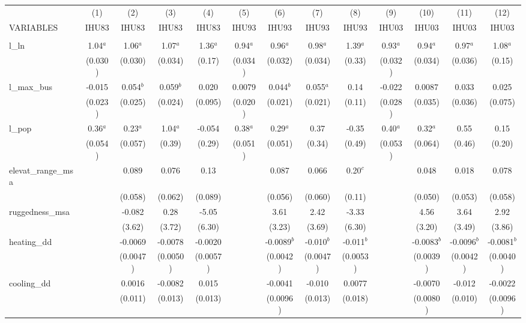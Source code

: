 \documentclass[]{article}
\begin{document}
\begin{tabular}{lcccccccccccc} \hline
 & (1) & (2) & (3) & (4) & (5) & (6) & (7) & (8) & (9) & (10) & (11) & (12) \\
VARIABLES & IHU83 & IHU83 & IHU83 & IHU83 & IHU93 & IHU93 & IHU93 & IHU93 & IHU03 & IHU03 & IHU03 & IHU03 \\ \hline
 &  &  &  &  &  &  &  &  &  &  &  &  \\
l\_ln & 1.04$^a$ & 1.06$^a$ & 1.07$^a$ & 1.36$^a$ & 0.94$^a$ & 0.96$^a$ & 0.98$^a$ & 1.39$^a$ & 0.93$^a$ & 0.94$^a$ & 0.97$^a$ & 1.08$^a$ \\
 & (0.030) & (0.030) & (0.034) & (0.17) & (0.034) & (0.032) & (0.034) & (0.33) & (0.032) & (0.034) & (0.036) & (0.15) \\
l\_max\_bus & -0.015 & 0.054$^b$ & 0.059$^b$ & 0.020 & 0.0079 & 0.044$^b$ & 0.055$^a$ & 0.14 & -0.022 & 0.0087 & 0.033 & 0.025 \\
 & (0.023) & (0.025) & (0.024) & (0.095) & (0.020) & (0.021) & (0.021) & (0.11) & (0.028) & (0.035) & (0.036) & (0.075) \\
l\_pop & 0.36$^a$ & 0.23$^a$ & 1.04$^a$ & -0.054 & 0.38$^a$ & 0.29$^a$ & 0.37 & -0.35 & 0.40$^a$ & 0.32$^a$ & 0.55 & 0.15 \\
 & (0.054) & (0.057) & (0.39) & (0.29) & (0.051) & (0.051) & (0.34) & (0.49) & (0.053) & (0.064) & (0.46) & (0.20) \\
elevat\_range\_msa &  & 0.089 & 0.076 & 0.13 &  & 0.087 & 0.066 & 0.20$^c$ &  & 0.048 & 0.018 & 0.078 \\
 &  & (0.058) & (0.062) & (0.089) &  & (0.056) & (0.060) & (0.11) &  & (0.050) & (0.053) & (0.058) \\
ruggedness\_msa &  & -0.082 & 0.28 & -5.05 &  & 3.61 & 2.42 & -3.33 &  & 4.56 & 3.64 & 2.92 \\
 &  & (3.62) & (3.72) & (6.30) &  & (3.23) & (3.69) & (6.30) &  & (3.20) & (3.49) & (3.86) \\
heating\_dd &  & -0.0069 & -0.0078 & -0.0020 &  & -0.0089$^b$ & -0.010$^b$ & -0.011$^b$ &  & -0.0083$^b$ & -0.0096$^b$ & -0.0081$^b$ \\
 &  & (0.0047) & (0.0050) & (0.0057) &  & (0.0042) & (0.0047) & (0.0053) &  & (0.0039) & (0.0042) & (0.0040) \\
cooling\_dd &  & 0.0016 & -0.0082 & 0.015 &  & -0.0041 & -0.010 & 0.0077 &  & -0.0070 & -0.012 & -0.0022 \\
 &  & (0.011) & (0.013) & (0.013) &  & (0.0096) & (0.013) & (0.018) &  & (0.0080) & (0.010) & (0.0096) \\

\end{tabular}
\end{document}
